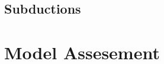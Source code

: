 \documentclass[extra,mreferee]{gji}
\begin{document}


\subsection{Subductions}

\section{Model Assesement}
\end{document}
